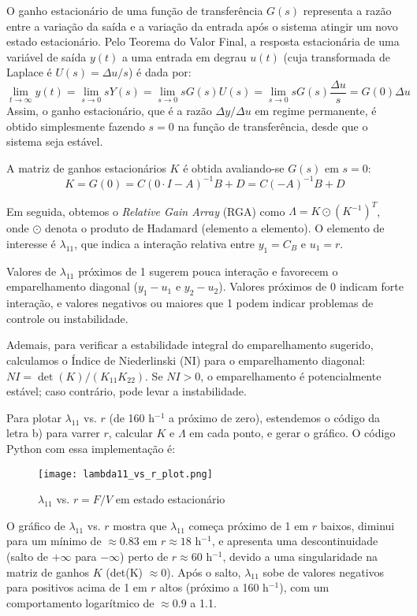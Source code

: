 \documentclass{article}
\begin{document}
O ganho estacionário de uma função de transferência $G(s)$ representa a razão entre a variação da saída e a variação da entrada após o sistema atingir um novo estado estacionário. Pelo Teorema do Valor Final, a resposta estacionária de uma variável de saída $y(t)$ a uma entrada em degrau $u(t)$ (cuja transformada de Laplace é $U(s) = \Delta u/s$) é dada por:
\[
\lim_{t \to \infty} y(t) = \lim_{s \to 0} s Y(s) = \lim_{s \to 0} s G(s) U(s) = \lim_{s \to 0} s G(s) \frac{\Delta u}{s} = G(0) \Delta u
\]
Assim, o ganho estacionário, que é a razão $\Delta y / \Delta u$ em regime permanente, é obtido simplesmente fazendo $s=0$ na função de transferência, desde que o sistema seja estável.

A matriz de ganhos estacionários $K$ é obtida avaliando-se $G(s)$ em $s=0$:
\[
K = G(0) = C(0 \cdot I - A)^{-1}B + D = C(-A)^{-1}B + D
\]

Em seguida, obtemos o \textit{Relative Gain Array} (RGA) como $ \Lambda = K \odot (K^{-1})^T $, onde $\odot$ denota o produto de Hadamard (elemento a elemento). O elemento de interesse é $\lambda_{11}$, que indica a interação relativa entre $y_1 = C_B$ e $u_1 = r$.

Valores de $\lambda_{11}$ próximos de 1 sugerem pouca interação e favorecem o emparelhamento diagonal ($y_1-u_1$ e $y_2-u_2$). Valores próximos de 0 indicam forte interação, e valores negativos ou maiores que 1 podem indicar problemas de controle ou instabilidade.

Ademais, para verificar a estabilidade integral do emparelhamento sugerido, calculamos o Índice de Niederlinski (NI) para o emparelhamento diagonal: $ NI = \det(K) / (K_{11} K_{22}) $. Se $NI > 0$, o emparelhamento é potencialmente estável; caso contrário, pode levar a instabilidade.

Para plotar $\lambda_{11}$ vs. $r$ (de 160 h$^{-1}$ a próximo de zero), estendemos o código da letra b) para varrer $r$, calcular $K$ e $\Lambda$ em cada ponto, e gerar o gráfico. O código Python com essa implementação é:



\begin{figure}[ht]
  \centering
  \texttt{[image: lambda11\_vs\_r\_plot.png]}
  \caption{$\lambda_{11}$ vs. $r = F/V$ em estado estacionário}
\end{figure}

O gráfico de $\lambda_{11}$ vs. $r$ mostra que $\lambda_{11}$ começa próximo de 1 em $r$ baixos, diminui para um mínimo de $\approx 0.83$ em $r \approx 18$ h$^{-1}$, e apresenta uma descontinuidade (salto de $+\infty$ para $-\infty$) perto de $r \approx 60$ h$^{-1}$, devido a uma singularidade na matriz de ganhos $K$ (det(K) $\approx 0$). Após o salto, $\lambda_{11}$ sobe de valores negativos para positivos acima de 1 em $r$ altos (próximo a 160 h$^{-1}$), com um comportamento logarítmico de $\approx 0.9$ a 1.1.
\end{document}
